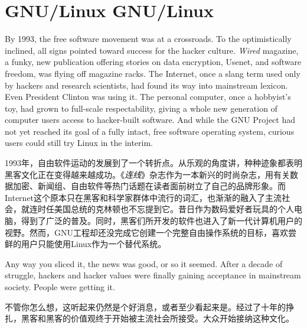 

\chapter{\ifdefined\eng
GNU/Linux
\fi
\ifdefined\chs
GNU/Linux
\fi}

\ifdefined\eng
By 1993, the free software movement was at a crossroads. To the optimistically inclined, all signs pointed toward success for the hacker culture. \textit{Wired} magazine, a funky, new publication offering stories on data encryption, Usenet, and software freedom, was flying off magazine racks. The Internet, once a slang term used only by hackers and research scientists, had found its way into mainstream lexicon. Even President Clinton was using it. The personal computer, once a hobbyist's toy, had grown to full-scale respectability, giving a whole new generation of computer users access to hacker-built software. And while the GNU Project had not yet reached its goal of a fully intact, free software operating system, curious users could still try Linux in the interim.
\fi

\ifdefined\chs
1993年，自由软件运动的发展到了一个转折点。从乐观的角度讲，种种迹象都表明黑客文化正在变得越来越成功。《\textit{连线}》杂志作为一本新兴的时尚杂志，用有关数据加密、新闻组、自由软件等热门话题在读者面前树立了自己的品牌形象。而Internet这个原本只在黑客和科学家群体中流行的词汇，也渐渐的融入了主流社会，就连时任美国总统的克林顿也不忘提到它。昔日作为数码爱好者玩具的个人电脑，得到了广泛的普及。同时，黑客们所开发的软件也进入了新一代计算机用户的视野。然而，GNU工程却还没完成它创建一个完整自由操作系统的目标，喜欢尝鲜的用户只能使用Linux作为一个替代系统。
\fi

\ifdefined\eng
Any way you sliced it, the news was good, or so it seemed. After a decade of struggle, hackers and hacker values were finally gaining acceptance in mainstream society. People were getting it.
\fi

\ifdefined\chs
不管你怎么想，这听起来仍然是个好消息，或者至少看起来是。经过了十年的挣扎，黑客和黑客的价值观终于开始被主流社会所接受。大众开始接纳这种文化。
\fi

